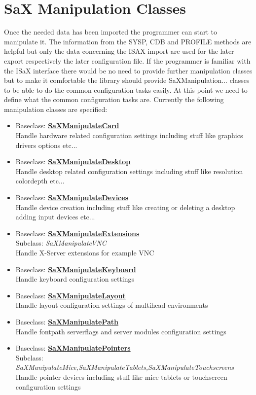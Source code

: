 \newpage

\section{SaX Manipulation Classes}
Once the needed data has been imported the programmer can start to
manipulate it. The information from the SYSP, CDB and PROFILE methods
are helpful but only the data concerning the ISAX import are used for
the later export respectively the later configuration file. If the
programmer is familiar with the ISaX interface there would be no need
to provide further manipulation classes but to make it comfortable
the library should provide SaXManipulation... classes to be able to
do the common configuration tasks easily. At this point we need to
define what the common configuration tasks are. Currently the following
manipulation classes are specified:

\begin{itemize}
\item Baseclass: \textbf{\underline{SaXManipulateCard}}\\
      Handle hardware related configuration settings including
      stuff like graphics drivers options etc...
\item Baseclass: \textbf{\underline{SaXManipulateDesktop}}\\
      Handle desktop related configuration settings including
      stuff like resolution colordepth etc...
\item Baseclass: \textbf{\underline{SaXManipulateDevices}}\\
      Handle device creation including stuff like creating or
      deleting a desktop adding input devices etc...
\item Baseclass: \textbf{\underline{SaXManipulateExtensions}}\\
      Subclass:\hspace*{0.2cm} \textit{SaXManipulateVNC}\\
      Handle X-Server extensions for example VNC
\item Baseclass: \textbf{\underline{SaXManipulateKeyboard}}\\
      Handle keyboard configuration settings
\item Baseclass: \textbf{\underline{SaXManipulateLayout}}\\
      Handle layout configuration settings of multihead
      environments
\item Baseclass: \textbf{\underline{SaXManipulatePath}}\\
      Handle fontpath serverflags and server modules configuration settings
\item Baseclass: \textbf{\underline{SaXManipulatePointers}}\\
      Subclass:\hspace*{0.2cm} \textit{SaXManipulateMice,SaXManipulateTablets,SaXManipulateTouchscreens}\\
      Handle pointer devices including stuff like mice tablets or
      touchscreen configuration settings
\end{itemize}
 
